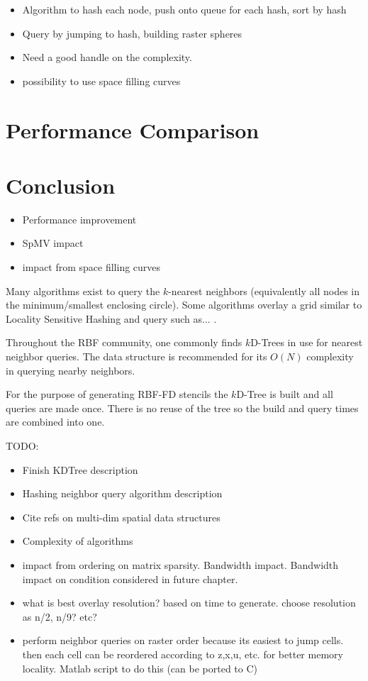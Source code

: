 \documentclass{report}
\begin{document}
\begin{itemize} 
\item Algorithm to hash each node, push onto queue for each hash, sort by hash
\item Query by jumping to hash, building raster spheres
\item Need a good handle on the complexity. 
\item possibility to use space filling curves
\end{itemize}

\section{Performance Comparison}

\section{Conclusion}
\begin{itemize}
\item Performance improvement
\item SpMV impact
\item impact from space filling curves
\end{itemize}





Many algorithms exist to query the $k$-nearest neighbors (equivalently all nodes in the minimum/smallest enclosing circle). Some algorithms overlay a grid similar to Locality Sensitive Hashing and query such as... \cite{HarPeledMazumdar2003}.

Throughout the RBF community, one commonly finds $k$D-Trees in use for nearest neighbor queries. The data structure is recommended for its $O(N)$ complexity in querying nearby neighbors. 



For the purpose of generating RBF-FD stencils the $k$D-Tree is built and all queries are made once. There is no reuse of the tree so the build and query times are combined into one. 

TODO:
\begin{itemize}
\item Finish KDTree description
\item Hashing neighbor query algorithm description
\item Cite refs on multi-dim spatial data structures
\item Complexity of algorithms
\item impact from ordering on matrix sparsity. Bandwidth impact. Bandwidth impact on condition considered in future chapter. 
\item what is best overlay resolution? based on time to generate. choose resolution as n/2, n/9? etc? 
\item perform neighbor queries on raster order because its easiest to jump cells. then each cell can be reordered according to z,x,u, etc. for better memory locality. Matlab script to do this (can be ported to C)
\end{itemize}
\end{document}
